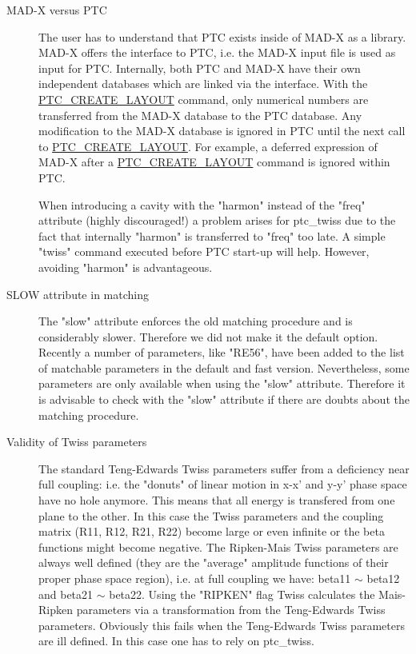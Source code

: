 \begin{description}
\item[MAD-X versus PTC] 
  The user has to understand that PTC exists inside of MAD-X as a
  library. MAD-X offers the interface to PTC, i.e. the MAD-X input
  file is used as input for PTC. Internally, both PTC and MAD-X have
  their own independent databases which are linked via the
  interface. With the
  \href{../ptc_general/ptc_general.html#PTC_CREATE_LAYOUT}{PTC\_CREATE\_LAYOUT}
  command, only numerical numbers are transferred from the MAD-X
  database to the PTC database. Any modification to the MAD-X
  database is ignored in PTC until the next call to
  \href{../ptc_general/ptc_general.html#PTC_CREATE_LAYOUT}{PTC\_CREATE\_LAYOUT}.
  For example, a deferred expression of MAD-X after a
  \href{../ptc_general/ptc_general.html#PTC_CREATE_LAYOUT}{PTC\_CREATE\_LAYOUT}
  command is ignored within PTC.  
  
  When introducing a cavity with the "harmon" instead of the "freq"
  attribute (highly discouraged!) a problem arises for ptc\_twiss due to
  the fact that internally "harmon" is transferred to "freq" too late. A
  simple "twiss" command executed before PTC start-up will help. However,
  avoiding "harmon" is advantageous.  
    

\item[SLOW attribute in matching] 
  The "slow" attribute enforces the old matching procedure and is
  considerably slower. Therefore we did not make it the default
  option. Recently a number of parameters, like "RE56", have been
  added to the list of matchable parameters in the default and fast
  version. Nevertheless, some parameters are only available when using
  the "slow" attribute. Therefore it is advisable to check with the
  "slow" attribute if there are doubts about the matching procedure.  



\item[Validity of Twiss parameters]
  The standard Teng-Edwards Twiss parameters suffer from a deficiency near
  full coupling: i.e. the "donuts" of linear motion in x-x' and y-y' phase
  space have no hole anymore. This means that all energy is transfered
  from one plane to the other. In this case the Twiss parameters and the
  coupling matrix (R11, R12, R21, R22) become large or even infinite or
  the beta functions might become negative. The Ripken-Mais Twiss
  parameters are always well defined (they are the "average" amplitude
  functions of their proper phase space region), i.e. at full coupling we
  have: beta11 $\sim$ beta12 and beta21 $\sim$ beta22. Using the "RIPKEN"
  flag Twiss calculates the Mais-Ripken parameters via a transformation
  from the Teng-Edwards Twiss parameters. Obviously this fails when the
  Teng-Edwards Twiss parameters are ill defined. In this case one has to
  rely on ptc\_twiss.    
  
\end{description}


